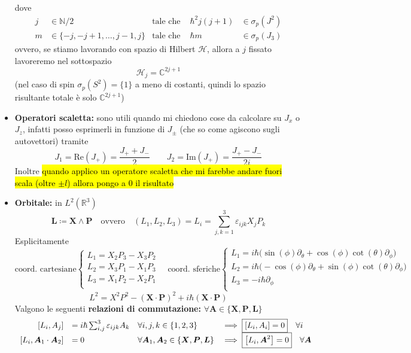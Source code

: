 \documentclass[a4paper,10pt]{article}
\theoremstyle{definition}
\newcommand{\bv}{\boldsymbol} %
\newcommand{\na}{\mathbb{N}} %
\newcommand{\re}{\mathbb{R}} %
\newcommand{\im}{\mathbb{C}} %
\newcommand{\hil}{\mathcal{H}} %
\theoremstyle{indentdefinition}
\theoremstyle{indenttheorem}
\theoremstyle{myremark}
\theoremstyle{indentgeneral}
\begin{document}
\begin{itemize}
    dove
    $$\begin{array}{clcrc}
        j  &\in\na/2  &\text{tale che } &\hbar^2 j(j+1)&\in \sigma_p(J^2) \\
          m  &\in \{-j,-j+1,\dots,j-1,j\} &\text{tale che } &\hbar m&\in \sigma_p(J_3)
    \end{array}$$
    ovvero, se stiamo lavorando con spazio di Hilbert $\hil$, allora a $j$ fissato lavoreremo nel sottospazio
    $$\hil_j=\im^{2j+1}$$
    (nel caso di spin $\sigma_p(S^2)=\{1\}$ a meno di costanti, quindi lo spazio risultante totale è solo $\im^{2j+1}$)
    \item \textbf{Operatori scaletta:} sono utili quando mi chiedono cose da calcolare su $J_x$ o $J_z$, infatti posso esprimerli in funzione di $J_\pm$ (che so come agiscono sugli autovettori) tramite
    $$J_1=\text{Re}(J_+)=\frac{J_++J_-}{2}\qquad J_2=\text{Im}(J_+)=\frac{J_+-J_-}{2i}$$
    Inoltre \hl{quando applico un operatore scaletta che mi farebbe andare fuori scala (oltre $\pm l$) allora pongo a 0 il risultato}
    \item \textbf{Orbitale:} in $L^2(\re^3)$
    $$\boxed{\bv{L}\coloneqq\bv{X}\wedge \bv{ P}} \quad\text{ovvero}\quad (L_1,L_2,L_3)= L_i=\sum_{j,k=1}^3\varepsilon_{ijk}X_jP_k$$
    Esplicitamente
    $$\text{coord. cartesiane} \begin{cases}
        L_1=X_2P_3-X_3P_2\\
        L_2=X_3P_1-X_1P_3\\
        L_3=X_1P_2-X_2P_1\\
    \end{cases}\quad \text{coord. sferiche} \begin{cases}
        L_1=i\hbar\big(\sin(\phi)\partial_\theta+\cos(\phi)\cot(\theta)\partial_\phi\big)\\
        L_2=i\hbar\big(-\cos(\phi)\partial_\theta+\sin(\phi)\cot(\theta)\partial_\phi\big)\\
        \boxed{L_3=-i\hbar \partial_\phi}\\
    \end{cases}$$
    $$L^2=X^2P^2-(\bv{X}\cdot\bv{P})^2+i\hbar (\bv{X}\cdot\bv{P})$$
    Valgono le seguenti \textbf{relazioni di commutazione:} $\forall \bv{A}\in\{\bv{X},\bv{P},\bv{L}\}$
    $$\begin{array}{rl l l}
         \left[L_i,A_j\right]&=i\hbar\sum_{i,j}^3\varepsilon_{ijk}A_k & \forall i,j,k\in\{1,2,3\}&\implies\boxed{ \left[L_i,A_i\right]=0}\quad \forall i\\
          \left[L_i,\bv{A}_1\cdot \bv{A}_2\right]&=0 & \forall\bv{A}_1, \bv{A}_2\in\{\bv{X},\bv{P},\bv{L}\}&\implies \boxed{\left[L_i,\bv{A}^2\right]=0}\quad \forall \bv{A}\\

\end{array}$$
\end{itemize}
\end{document}
